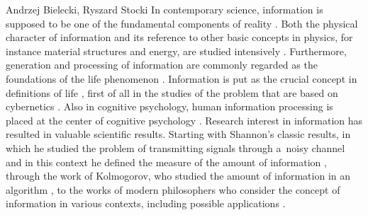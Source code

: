 \begin{artengenv2auth}{Andrzej Bielecki, Ryszard Stocki}
\lettrine[loversize=0.13,lines=2,lraise=-0.03,nindent=0em,findent=0.2pt]%
{I}{}n contemporary science, information is supposed to be one of the fundamental components of reality 
\parencites[][]{barreiro_third_2020}[][]{Krzanowski_Roman_Ontological}[][]{krzanowski_what_2020}. %
 Both the physical character of information and its reference to other basic concepts in physics, for instance material structures and energy, are studied intensively 
\parencites[][]{krzanowski_ontological_2022-1}[][]{krzanowski_ontological_2022}[][]{mscislawski_is_2022}[][]{polak_beyond_2022}. %
 Furthermore, generation and processing of information are commonly regarded as the foundations of the life phenomenon 
\parencites[][]{smith_concept_2000}[][]{nurse_life_2008}[][]{nurse_what_2020}[][]{davies_demon_2019}. %
 Information is put as the crucial concept in definitions of life 
\parencites[][]{bielecki_general_2015}[][]{Bielecki_2016}[][]{davies_demon_2019}, %
 first of all in the studies of the problem that are based on cybernetics 
\parencite[][]{korzeniewski_cybernetic_2001}. %
 Also in cognitive psychology, human information processing is placed at the center of cognitive psychology 
\parencite[][]{lindsay_human_1972}. %
 Research interest in information has resulted in valuable scientific results. Starting with Shannon's classic results, in which he studied the problem of transmitting signals through a~noisy channel and in this context he defined the measure of the amount of information 
\parencite[][]{shannon_mathematical_1948}, %
 through the work of Kol\-mogorov, who studied the amount of information in an algorithm 
\mbox{\parencite[][]{kolmogorov_three_1965},} %
 to the works of modern philosophers who consider the concept of information in various contexts, including possible applications 
\parencites[][]{bateson_information_1951}[][]{smith_concept_2000}[][]{burgin_information_2011}[][]{ebeling_selforganization_2015}[][]{davies_demon_2019}[][]{dodig-crnkovic_theoretical_2019}.%





\end{artengenv2auth}
